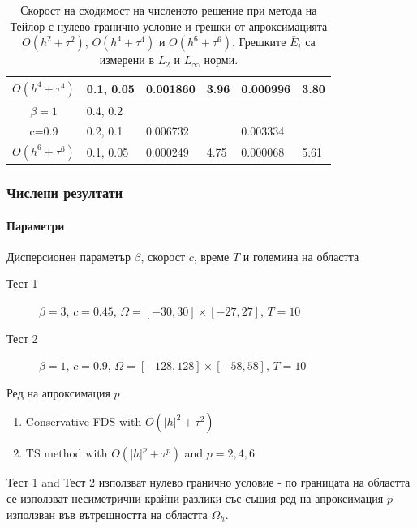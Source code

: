 \documentclass{beamer}
\begin{document}
\begin{frame}
\begin{table}[ht]
{\begin{tabular}{||c|l|ll|ll||}
 $O(h^4+ \tau^4)$ 	&0.1, 0.05   	&0.001860 	& 3.96  & 0.000996  & 3.80  \\
\hline
  $\beta=1$     		&0.4, 0.2   	&            	&          	&                  &      \\
      c=0.9                  &0.2, 0.1   	&0.006732 	&            & 0.003334      &       \\
 $O(h^6+ \tau^6)$ 	&0.1, 0.05 	& 0.000249 	& 4.75 	& 0.000068  & 5.61        \\
\hline
\hline 
		\end{tabular}
		}%
		\caption{Скорост на сходимост на численото решение при метода на Тейлор с нулево гранично условие и грешки от апроксимацията $O(h^{2} + \tau^2 )$, $O(h^{4} + \tau^4 )$ и $O(h^{6} + \tau^6 )$. Грешките $\bar E_i$ са измерени в $L_2$ и $L_\infty$ норми.}
\label{table:A}
\end{table}

\end{frame}


\begin{frame}
\frametitle{Числени резултати}
\framesubtitle{Параметри}

Дисперсионен параметър $\beta$, скорост $c$, време $T$ и големина на областта
\begin{description}
 \item[Тест 1] $\beta = 3$, $c = 0.45$, $\Omega = [-30, 30] \times [-27, 27]$, $T = 10$
 \item[Тест 2] $\beta = 1$, $c = 0.9$, $\Omega = [-128, 128] \times [-58, 58]$, $T = 10$
\end{description}

Ред на апроксимация $p$
\begin{enumerate}
  \item Conservative FDS with $O(|h|^2 + \tau^2)$
  \item TS method with $O(|h|^p + \tau^p)$ and $p = 2, 4, 6$
\end{enumerate}

Тест 1 and Тест 2 използват нулево гранично условие - по границата на областта се използват несиметрични крайни разлики със същия ред на апроксимация $p$ използван във вътрешността на областта $\Omega_h$.
\end{frame}

\end{document}
